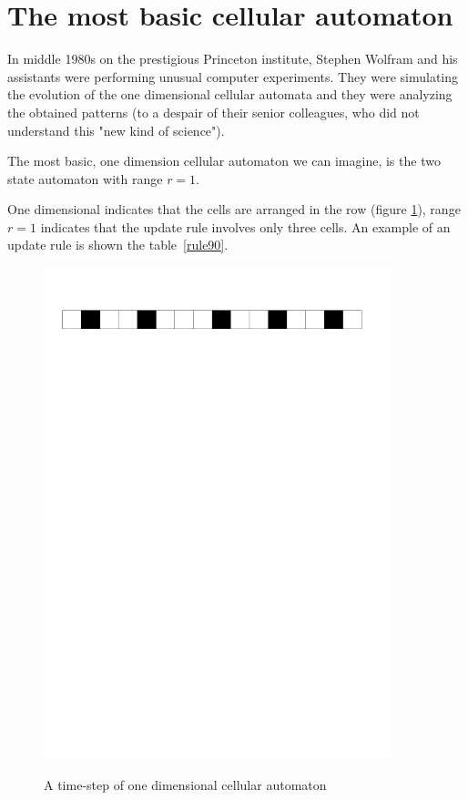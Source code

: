 \section{The most basic cellular automaton} 

In middle 1980s on the prestigious Princeton institute,
Stephen Wolfram and his assistants were performing unusual computer experiments. They were simulating the evolution of the one dimensional cellular automata and they were analyzing the obtained patterns \cite{levy} (to a despair of their senior colleagues, who did not understand this "new kind of science")\cite{wolfram}.

The most basic, one dimension cellular automaton we can imagine, is the two state automaton with range $r=1$.

One dimensional indicates that the cells are arranged in the row (figure \ref{1d}), range $r=1$ indicates that the update rule involves only three cells.
An example of an update rule is shown the table~\ref{rule90}.

\begin{figure}[htbp]
 \centering 
 \includegraphics[width=0.9\textwidth]{./img/1Dline}
 \label{1d}
 \caption{A time-step of one dimensional cellular automaton}
\end{figure}




